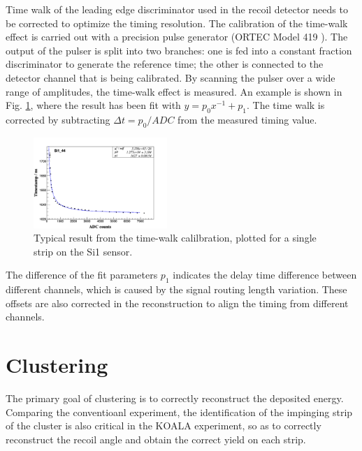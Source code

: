 \documentclass[number,5p]{elsarticle}
\begin{document}
Time walk of the leading edge discriminator used in the recoil detector needs to be corrected to optimize the timing resolution.
The calibration of the time-walk effect is carried out with a precision pulse generator (ORTEC Model 419 \cite{ortec}). 
The output of the pulser is split into two branches: one is fed into a constant fraction discriminator to generate the reference time;
the other is connected to the detector channel that is being calibrated. 
By scanning the pulser over a wide range of amplitudes, the time-walk effect is measured.
An example is shown in Fig. \ref{fig:timewalk}, where the result has been fit with \(y=p_0 x^{-1} + p_1\). 
The time walk is corrected by subtracting \(\Delta t = p_0/ADC\) from the measured timing value.
\begin{figure}[htbp]
  \centering
  \includegraphics[width=0.45\textwidth]{./timewalk.png}
  \caption{Typical result from the time-walk calilbration, plotted for a single
    strip on the Si1 sensor.}
  \label{fig:timewalk}
\end{figure}

The difference of the fit parameters \(p_1\) indicates the delay time
difference between different channels, which is caused by the signal routing length variation.
These offsets are also corrected in the reconstruction to align the timing from different channels.

\section{Clustering}
\label{sec:clustering}

The primary goal of clustering is to correctly reconstruct the deposited energy.
Comparing the conventioanl experiment, the identification of the impinging strip of
the cluster is also critical in the KOALA experiment, so as to correctly
reconstruct the recoil angle and obtain the correct yield on each strip.
\end{document}
